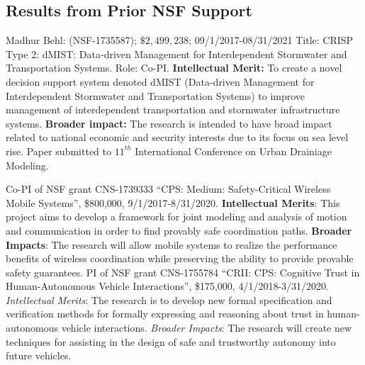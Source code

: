 \subsection{Results from Prior NSF Support}
\label{subsec:prior}

Madhur Behl: (NSF-1735587); $\$2,499,238$; 09/1/2017-08/31/2021 Title: CRISP Type 2: dMIST: Data-driven Management for Interdependent Stormwater and Transportation Systems. Role: Co-PI. \textbf{Intellectual Merit:} To create a novel decision support system denoted dMIST (Data-driven Management for Interdependent Stormwater and Transportation Systems) to improve management of interdependent transportation and stormwater infrastructure systems. %
\textbf{Broader impact:} The research is intended to have broad impact related to national economic and security interests due to its focus on sea level rise. Paper submitted to $11^{th}$ International Conference on Urban Drainiage Modeling. 


Co-PI of NSF grant CNS-1739333 ``CPS: Medium: Safety-Critical Wireless Mobile Systems'', \$800,000, 9/1/2017-8/31/2020. \textbf{Intellectual Merits}: This project aims to develop a framework for joint modeling and analysis of motion and communication in order to find provably safe coordination paths. \textbf{Broader Impacts}: The research will allow mobile systems to realize the performance benefits of wireless coordination while preserving the ability to provide provable safety guarantees. 
PI of NSF grant CNS-1755784 ``CRII: CPS: Cognitive Trust in Human-Autonomous Vehicle Interactions'', \$175,000, 4/1/2018-3/31/2020.
\emph{Intellectual Merits}: The research is to develop new formal specification and verification methods for formally expressing and reasoning about trust in human-autonomous vehicle interactions.
\emph{Broader Impacts}: The research will create new techniques for assisting in the design of safe and trustworthy autonomy into future vehicles.

